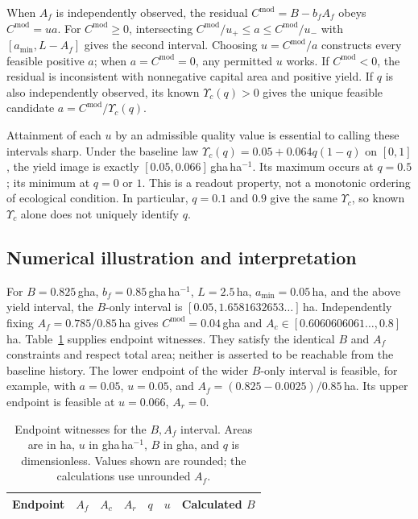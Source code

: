 \documentclass[11pt,a4paper]{article}
\newcommand{\Ups}{\Upsilon_c}
\begin{document}
When $A_f$ is independently observed, the residual $C^{\mathrm{mod}}=B-b_fA_f$ obeys $C^{\mathrm{mod}}=ua$. For $C^{\mathrm{mod}}\ge0$, intersecting $C^{\mathrm{mod}}/u_+\le a\le C^{\mathrm{mod}}/u_-$ with $[a_{\min},L-A_f]$ gives the second interval. Choosing $u=C^{\mathrm{mod}}/a$ constructs every feasible positive $a$; when $a=C^{\mathrm{mod}}=0$, any permitted $u$ works. If $C^{\mathrm{mod}}<0$, the residual is inconsistent with nonnegative capital area and positive yield. If $q$ is also independently observed, its known $\Ups(q)>0$ gives the unique feasible candidate $a=C^{\mathrm{mod}}/\Ups(q)$.

Attainment of each $u$ by an admissible quality value is essential to calling these intervals sharp. Under the baseline law $\Ups(q)=0.05+0.064q(1-q)$ on $[0,1]$, the yield image is exactly $[0.05,0.066]$\,gha\,ha$^{-1}$. Its maximum occurs at $q=0.5$; its minimum at $q=0$ or $1$. This is a readout property, not a monotonic ordering of ecological condition. In particular, $q=0.1$ and $0.9$ give the same $\Ups$, so known $\Ups$ alone does not uniquely identify $q$.

\subsection{Numerical illustration and interpretation}

For $B=0.825$\,gha, $b_f=0.85$\,gha\,ha$^{-1}$, $L=2.5$\,ha, $a_{\min}=0.05$\,ha, and the above yield interval, the $B$-only interval is $[0.05,1.6581632653\ldots]$\,ha. Independently fixing $A_f=0.785/0.85$\,ha gives $C^{\mathrm{mod}}=0.04$\,gha and $A_c\in[0.6060606061\ldots,0.8]$\,ha. Table~\ref{tab:si_c13witness} supplies endpoint witnesses. They satisfy the identical $B$ and $A_f$ constraints and respect total area; neither is asserted to be reachable from the baseline history. The lower endpoint of the wider $B$-only interval is feasible, for example, with $a=0.05$, $u=0.05$, and $A_f=(0.825-0.0025)/0.85$\,ha. Its upper endpoint is feasible at $u=0.066$, $A_r=0$.

\begin{table}[htbp]
\centering\small
\caption{Endpoint witnesses for the $B,A_f$ interval. Areas are in ha, $u$ in gha\,ha$^{-1}$, $B$ in gha, and $q$ is dimensionless. Values shown are rounded; the calculations use unrounded $A_f$.}
\label{tab:si_c13witness}
\begin{tabular}{lrrrrrr}
\toprule
Endpoint & $A_f$ & $A_c$ & $A_r$ & $q$ & $u$ & Calculated $B$ \\
\midrule

\end{tabular}
\end{table}
\end{document}
